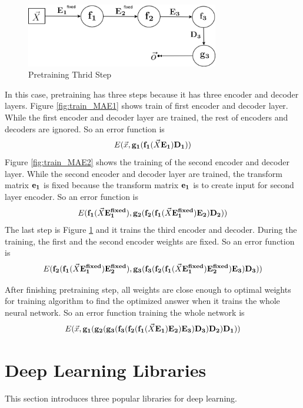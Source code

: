 \documentclass[draft,dvipsnames]{drexel-thesis}
\begin{document}
\begin{thesis}
\begin{figure}[t!]
    \centering
    \includegraphics[width=0.75\textwidth]{pictures/figures/train_MAE3.png}
    \caption{Pretraining Thrid Step}
    \label{fig:train_MAE3}
\end{figure}

	In this case, pretraining has three steps because it has three encoder and decoder layers. Figure \ref{fig:train_MAE1} shows train of first encoder and decoder layer. While the first encoder and decoder layer are trained, the rest of encoders and decoders are ignored. So an error function is
$$E(\vec{x}, \bold{g_1}(\bold{f_1}(\vec{X}\bold{E_1})\bold{D_1}))$$
Figure \ref{fig:train_MAE2} shows the training of the second encoder and decoder layer. While the second encoder and decoder layer are trained, the transform matrix $\bold{e_1}$ is fixed because the transform matrix $\bold{e_1}$ is to create input for second layer encoder. So an error function is
$$E(\bold{f_1}(\vec{X}\bold{E_1^{fixed}}), \bold{g_2}(\bold{f_2}(\bold{f_1}(\vec{X}\bold{E_1^{fixed}})\bold{E_2})\bold{D_2}))$$
The last step is Figure \ref{fig:train_MAE3} and it trains the third encoder and decoder. During the training, the first and the second encoder weights are fixed. So an error function is
$$E(\bold{f_2}(\bold{f_1}(\vec{X}\bold{E_1^{fixed}})\bold{E_2^{fixed}}), \bold{g_3}(\bold{f_3}(\bold{f_2}(\bold{f_1}(\vec{X}\bold{E_1^{fixed}})\bold{E_2^{fixed}})\bold{E_3})\bold{D_3}))$$

	After finishing pretraining step, all weights are close enough to optimal weights for training algorithm to find the optimized answer when it trains the whole neural network. So an error function training the whole network is
$$E(\vec{x}, \bold{g_1}(\bold{g_2}(\bold{g_3}(\bold{f_3}(\bold{f_2}(\bold{f_1}(\vec{X}\bold{E_1})\bold{E_2})\bold{E_3})\bold{D_3})\bold{D_2})\bold{D_1}))$$


\section{Deep Learning Libraries}\label{sec:DLL}
This section introduces three popular libraries for deep learning.


\end{thesis}
\end{document}

